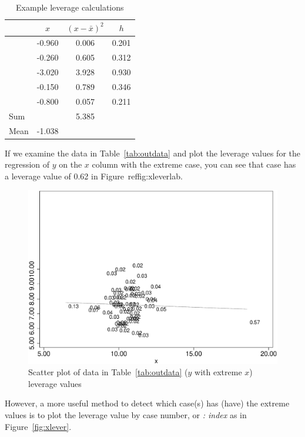 \begin{table}[htbp]\centering
\caption{Example leverage calculations
\label{tab:lever}}
\begin{tabular}{lccc}
\hline
& $x$ & $\left(x-\bar{x}\right)^2$ & $h$ \\
\hline
&-0.960&0.006&0.201 \\
&-0.260&0.605&0.312 \\
&-3.020&3.928&0.930 \\
&-0.150&0.789&0.346 \\
&-0.800&0.057&0.211 \\
\hline
Sum & & 5.385 \\
Mean & -1.038 \\
\hline
\end{tabular}
\end{table}

If we examine the data in Table~\ref{tab:outdata} and plot the leverage values for the regression of $y$ on the $x$ column with the extreme case, you can see that case has a leverage value of 0.62 in Figure~ref{fig:xleverlab}.


\begin{figure}
   \centering
   \includegraphics[angle=0,
           width=.75\textwidth]{xout_hatvalues_label.eps}
   \caption{Scatter plot of data in Table~\ref{tab:outdata} ($y$ with extreme $x$) leverage values}
  \label{fig:xleverlab}
\end{figure}

However, a more useful method to detect which case(s) has (have) the extreme values is to plot the leverage value by case number, or {\it: index} as in Figure~\ref{fig:xlever}.

